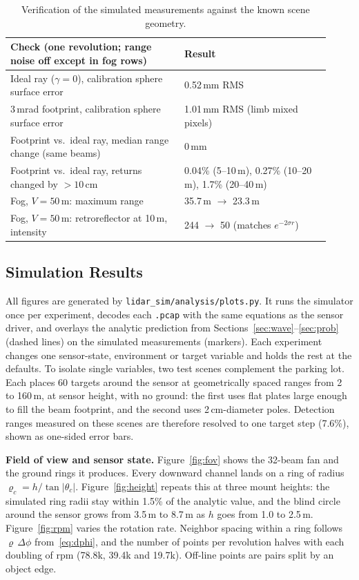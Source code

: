 \documentclass[11pt]{article}
\begin{document}
\begin{table}[h]
\centering
\small
\begin{tabular}{p{0.5\linewidth}p{0.42\linewidth}}
\toprule
Check (one revolution; range noise off except in fog rows) & Result \\
\midrule
Ideal ray ($\gamma = 0$), calibration sphere surface error & 0.52\,mm RMS \\
3\,mrad footprint, calibration sphere surface error & 1.01\,mm RMS (limb mixed pixels) \\
Footprint vs.\ ideal ray, median range change (same beams) & 0\,mm \\
Footprint vs.\ ideal ray, returns changed by $>10$\,cm & 0.04\% (5--10\,m), 0.27\% (10--20\,m), 1.7\% (20--40\,m) \\
Fog, $V = 50$\,m: maximum range & 35.7\,m $\to$ 23.3\,m \\
Fog, $V = 50$\,m: retroreflector at 10\,m, intensity & 244 $\to$ 50 (matches $e^{-2\sigma r}$) \\
\bottomrule
\end{tabular}
\caption{Verification of the simulated measurements against the known scene geometry.}
\end{table}

\subsection{Simulation Results}\label{sec:results}
All figures are generated by \texttt{lidar\_sim/analysis/plots.py}. It runs the simulator once per experiment, decodes each \texttt{.pcap} with the
same equations as the sensor driver, and overlays the analytic prediction from Sections~\ref{sec:wave}--\ref{sec:prob} (dashed lines) on the simulated
measurements (markers). Each experiment changes one sensor-state, environment or target variable and holds the rest at the defaults.
To isolate single variables, two test scenes complement the parking lot. Each places 60 targets around the sensor at geometrically spaced ranges
from 2 to 160\,m, at sensor height, with no ground: the first uses flat plates large enough to fill the beam footprint, and the second uses 2\,cm-diameter poles.
Detection ranges measured on these scenes are therefore resolved to one target step (7.6\%), shown as one-sided error bars.

\textbf{Field of view and sensor state.} Figure~\ref{fig:fov} shows the 32-beam fan and the ground rings it produces.
Every downward channel lands on a ring of radius $\varrho_c = h/\tan|\theta_c|$. Figure~\ref{fig:height} repeats this at three mount heights:
the simulated ring radii stay within 1.5\% of the analytic value, and the blind circle around the sensor grows from 3.5\,m to 8.7\,m as $h$ goes from 1.0 to 2.5\,m.
Figure~\ref{fig:rpm} varies the rotation rate. Neighbor spacing within a ring follows $\varrho\,\Delta\phi$ from~\eqref{eq:dphi}, and the number of points per
revolution halves with each doubling of rpm (78.8k, 39.4k and 19.7k). Off-line points are pairs split by an object edge.
\end{document}
